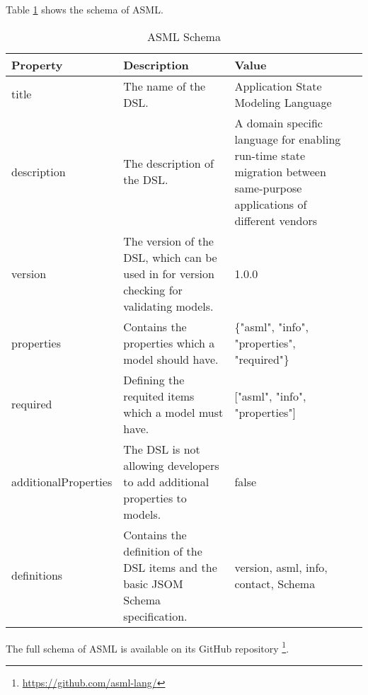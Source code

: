 Table \ref{tab:asml-schema} shows the schema of ASML.

\begin{table}
\begin{tabularx}{\textwidth}{|l|X|X|r|}
\hline
Property             & Description                                                                              & Value                                                                                                                   \\\hline
title                & The name of the DSL.                                                                     & Application State Modeling Language                                                                                     \\\hline
description          & The description of the DSL.                                                              & A domain specific language for enabling run-time state migration between same-purpose applications of different vendors \\\hline
version              & The version of the DSL, which can be used in for version checking for validating models. & 1.0.0                                                                                                                   \\\hline
properties           & Contains the properties which a model should have.                                       & \{"asml", "info", "properties", "required"\}                                                                            \\\hline
required             & Defining the requited items which a model must have.                                     & {[}"asml", "info", "properties"{]}                                                                                      \\\hline
additionalProperties & The DSL is not allowing developers to add additional properties to models.               & false                                                                                                                   \\\hline
definitions          & Contains the definition of the DSL items and the basic JSOM Schema specification.        & version, asml, info, contact, Schema

\\\hline
\end{tabularx}
\caption{ASML Schema}
\label{tab:asml-schema}
\end{table}


The full schema of ASML is available on its GitHub repository
\footnote{\href{https://github.com/asml-lang/asml/blob/master/schemas/schema.json}{https://github.com/asml-lang/}}.

